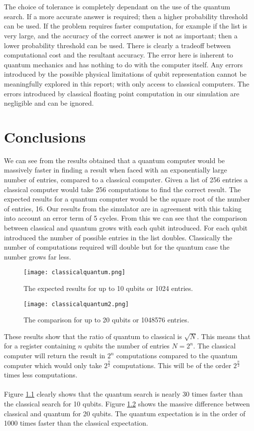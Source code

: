 \documentclass[12pt]{report}
\begin{document}
\\ \\ 
The choice of tolerance is completely dependant on the use of the quantum search.  If a more accurate answer is required; then a higher probability threshold can be used.  If the problem requires faster computation, for example if the list is very large, and the accuracy of the correct answer is not as important; then a lower probability threshold can be used.   There is clearly a tradeoff between computational cost and the resultant accuracy.  The error here is inherent to quantum mechanics and has nothing to do with the computer itself.  Any errors introduced by the possible physical limitations of qubit representation cannot be meaningfully explored in this report; with only access to classical computers.  The errors introduced by classical floating point computation in our simulation are negligible and can be ignored.
\chapter{Conclusions}
We can see from the results obtained that a quantum computer would be massively faster in finding a result when faced with an exponentially large number of entries, compared to a classical computer. Given a list of 256 entries a classical computer would take 256 computations to find the correct result. The expected results for a quantum computer would be the square root of the number of entries, 16. Our results from the simulator are in agreement with this taking into account an error term of 5 cycles. From this we can see that the comparison between classical and quantum grows with each qubit introduced. For each qubit introduced the number of possible entries in the list doubles. Classically the number of computations required will double but for the quantum case the number grows far less.
\begin{figure} [h!]
\texttt{[image: classicalquantum.png]}
\caption{The expected results for up to 10 qubits or 1024 entries.}
\label{fig:CQ}
\end{figure}

\begin{figure} [h!]
\texttt{[image: classicalquantum2.png]}
\caption{The comparison for up to 20 qubits or 1048576 entries.}
\label{fig:CQ2}
\end{figure}
These results show that the ratio of quantum to classical is $\sqrt{N}$. This means that for a register containing $n$ qubits the number of entries $N=2^n$. The classical computer will return the result in $2^n$ computations compared to the quantum computer which would only take $2^{\frac{n}{2}}$ computations. This will be of the order $2^{\frac{n}{2}}$ times less computations. \\ \\ 
Figure \ref{fig:CQ} clearly shows that the quantum search is nearly 30 times faster than the classical search for 10 qubits. Figure \ref{fig:CQ2} shows the massive difference between classical and quantum for 20 qubits. The quantum expectation is in the order of 1000 times faster than the classical expectation. 
\end{document}
